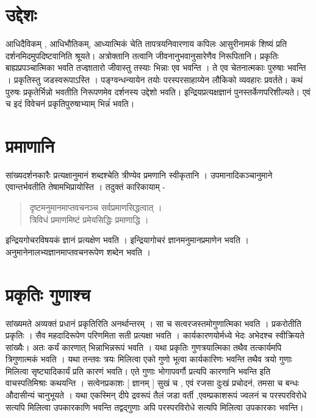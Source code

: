 \section*{उद्देशः}

आधिदैविकम् , आधिभौतिकम्, आध्यात्मिकं चेति तापत्रयनिवारणाय कपिलः आसुरीनामकं शिष्यं प्रति दर्शनमिदमुपदिष्टवानिति श्रूयते। अत्रोक्तानि तत्वानि जीवनानुभवानुसारेणैव निरूपितानि। प्रकृतिः बाह्यप्रपञ्चात्मिका भवति तज्ज्ञातारो जीवास्तु तस्याः भिन्नाः एव भवन्ति । ते एव चेतनात्मकाः पुरुषाः भवन्ति । प्रकृतिस्तु जडस्वरूपाऽस्ति । पङ्ग्वन्धन्यायेन तयोः परस्परसाहाय्येन लौकिको व्यवहारः प्रवर्तते। कथं पुरुषः प्रकृतेर्भिन्नो भवतीति निरूपणमेव दर्शनस्य उद्देशो भवति। इन्द्रियप्रत्यक्षज्ञानं पुनस्तर्केणपरिशील्यते। एवं च इदं विवेचनं प्रकृतिपुरुषाभ्याम् भिन्नंं भवति।

\section*{प्रमाणानि}

 सांख्यदर्शनकारैः प्रत्यक्षानुमानं शब्दश्चेति त्रीण्येव प्रमणानि स्वीकृतानि । उपमानादिकञ्चानुमाने एवान्तर्भवतीति तेषामभिप्रायोस्ति । तदुक्तं कारिकायाम् - 
\begin{verse}
दृष्टमनुमानमाप्तवचनञ्च सर्वप्रमाणसिद्धत्वात् । \\
त्रिविधं प्रमाणमिष्टं प्रमेयसिद्धिः प्रमाणाद्धि । 
\end{verse}
इन्द्रियगोचरविषयकं ज्ञानं प्रत्यक्षेण भवति । इन्द्रियागोचरं ज्ञानमनुमानप्रमाणेन भवति । अनुमानेनालभ्यज्ञानमाप्तवचनरूपेण शब्देन भवति । 

\section*{प्रकृतिः गुणाश्च}

सांख्यमते अव्यक्तं प्रधानं प्रकृतिरिति अनर्थान्तरम् । सा च सत्वरजस्तमोगुणात्मिका भवति । प्रकरोतीति प्रकृतिः । सैव महदादिरूपेण परिणमिता सती प्रत्यक्षा भवति । कार्यकारणयोर्मध्ये भेदः अभेदश्च स्वीक्रियते सांख्यैः। अतः कर्यं कारणात् भिन्नाभिन्नरूपं भवति । यथा प्रकृतिः गुणत्रयात्मिका तथैव तत्कार्यमपि त्रिगुणात्मकं भवति । यथा तन्तवः त्रयः मिलित्वा एको गुणो भूत्वा कार्यकारिणः भवन्ति तथैव त्रयो गुणाः मिलित्वा सृष्ट्यादिकार्यं प्रति कारणं भवति। एते गुणाः भोगापवर्गौ प्रत्यपि कारणानि भवन्ति इति वाचस्पतिमिश्राः कथयन्ति । सत्वेनप्रकाशः [ ज्ञानम् ] सुखं च , एवं रजसा दुःखं प्रचोदनं, तमसा च बन्धः औदासीन्यं चानुभूयते । यथा एकस्मिन् दीपे द्रवरूपं तैलं जडा वर्ती ,एवम्प्रकाशरूपं ज्वलनं च परस्परविरोधे सत्यपि मिलित्वा उपकारकाणि भवन्ति तद्वद्गुणाः अपि परस्परविरोधे सत्यपि मिलित्वा उपकारकाः भवन्ति।   

